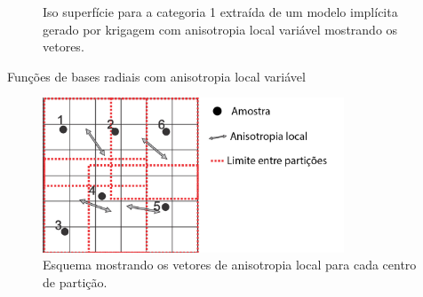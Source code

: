 \documentclass[aspectratio=169]{beamer}
\begin{document}
\begin{frame}
	\begin{figure}[H] 
		\caption{Iso superfície para a categoria 1 extraída de um modelo implícita gerado por krigagem com anisotropia local variável mostrando os vetores.} \label{lva_krig}
		\centering
	\end{figure}
\end{frame}

\begin{frame}{Funções de bases radiais com anisotropia local variável}
	\begin{figure}[H]
		\caption{\label{lva_rbf+cartoon} Esquema mostrando os vetores de anisotropia local para cada centro de partição.}
		\begin{center}
			\includegraphics[width=0.8\textwidth]{capitulo_2/lvarbf1.jpg}
		\end{center}
	\end{figure}
\end{frame}
\end{document}
